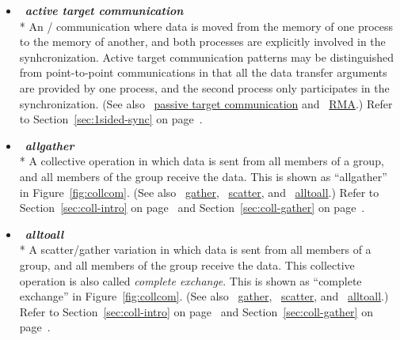 \begin{itemize}
\label{glossary:active_target_communication}
\item  ~\hypertarget{glossary:active_target_communication}{\emph{\textbf{active target communication}}} \\*
An \RMA/ communication where data is moved from the memory of one
process to the memory of another, and both processes are explicitly involved in the
synhcronization. Active target communication patterns may be distinguished from point-to-point
communications in that all the data transfer arguments are provided by
one process, and the second process only participates in the synchronization.
(See also ~\hyperlink{glossary:passive_target_communication}{passive target communication}  and
 ~\hyperlink{glossary:RMA}{RMA}.)
Refer to Section~\ref{sec:1sided-sync} on page~\pageref{sec:1sided-sync}.

\label{glossary:allgather}
\item  ~\hypertarget{glossary:allgather}{\emph{\textbf{allgather}}} \\*
A collective operation in which data is sent from all members of a group,
and all members of the group receive the data. 
This is shown as ``allgather'' in Figure~\ref{fig:collcom}.
(See also ~\hyperlink{glossary:gather}{gather},
~\hyperlink{glossary:scatter}{scatter},
and ~\hyperlink{glossary:alltoall}{alltoall}.)
Refer to Section~\ref{sec:coll-intro} on page~\pageref{sec:coll-intro} and  
Section~\ref{sec:coll-gather} on page~\pageref{sec:coll-gather}.

\label{glossary:alltoall}
\item  ~\hypertarget{glossary:alltoall}{\emph{\textbf{alltoall}}} \\*
A scatter/gather variation in which data is sent from all members of a group,
and all members of the group receive the data. This collective operation
is also called \emph{complete exchange}. 
This is shown as ``complete exchange'' in Figure~\ref{fig:collcom}.
(See also ~\hyperlink{glossary:gather}{gather},
~\hyperlink{glossary:scatter}{scatter},
and ~\hyperlink{glossary:alltoall}{alltoall}.)
Refer to Section~\ref{sec:coll-intro} on page~\pageref{sec:coll-intro} and  
Section~\ref{sec:coll-gather} on page~\pageref{sec:coll-gather}.


\end{itemize}
